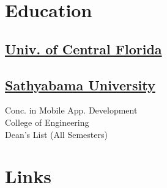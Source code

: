 \documentclass[letterpaper]{kishore-resume} %
\begin{document}
\begin{minipage}[t]{0.33\textwidth} %


\section{Education} 

\subsection{\href{http://www.ucf.edu/}{Univ. of Central Florida}}

\sectionspace %


\subsection{\href{http://www.sathyabamauniversity.ac.in}{Sathyabama University}}
Conc. in Mobile App. Development \\
College of Engineering \\
Dean's List (All Semesters) \\







\section{Links} 


\end{minipage}
\end{document}
